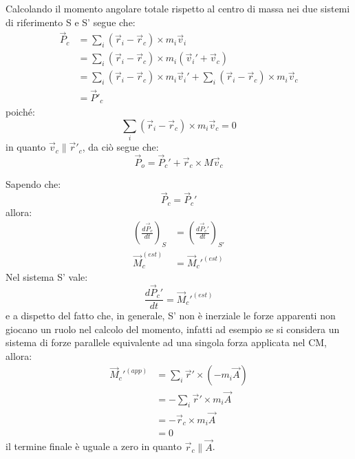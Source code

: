 \documentclass[11pt, a4paper, openright]{book}
\theoremstyle{plain}
\theoremstyle{definition}
\begin{document}
Calcolando il momento angolare totale rispetto al centro di massa nei due sistemi di riferimento S e S' segue che:
\begin{align}
    \vec{P}_c & = \sum_i(\vec{r}_i - \vec{r}_c) \times m_i\vec{v}_i \\
              & = \sum_i(\vec{r}_i - \vec{r}_c) \times m_i(\vec{v}_i' + \vec{v}_c) \\
              & = \sum_i(\vec{r}_i - \vec{r}_c) \times m_i\vec{v}_i' + \sum_i(\vec{r}_i - \vec{r}_c) \times m_i\vec{v}_c \\
              & = \vec{P}'_c
\end{align}
poiché:
\begin{equation}
    \sum_i(\vec{r}_i - \vec{r}_c) \times m_i\vec{v}_c = 0
\end{equation}
in quanto $\vec{v}_c \parallel \vec{r}'_c$, da ciò segue che:
\begin{equation}
    \vec{P}_o = \vec{P}_c' + \vec{r}_c \times M\vec{v}_c
\end{equation}

Sapendo che:
\begin{equation}
    \vec{P}_c = \vec{P}_c'
\end{equation}
allora:
\begin{align}
    \left(\frac{d\vec{P}_c}{dt}\right)_S & = \left(\frac{d\vec{P}_c'}{dt}\right)_{S'} \\[10pt]
    \vec{M}_c^{(est)} & = \vec{M}_c'^{(est)} 
\end{align}
Nel sistema S' vale:
\begin{equation}
    \frac{d\vec{P}_c'}{dt} = \vec{M}_c'^{(est)}
\end{equation}
e a dispetto del fatto che, in generale, S' non è inerziale le forze apparenti non giocano un ruolo nel calcolo del momento, infatti ad esempio se si considera un sistema di forze parallele equivalente ad una singola forza applicata nel CM, allora:
\begin{align}
    \vec{M}_c'^{(app)} & = \sum_i \vec{r}' \times (-m_i\vec{A}) \\
                       & = -\sum_i \vec{r}' \times m_i\vec{A} \\
                       & = -\vec{r}_c \times m_i\vec{A} \\
                       & = 0
\end{align}
il termine finale è uguale a zero in quanto $\vec{r}_c \parallel \vec{A}$.
\end{document}
